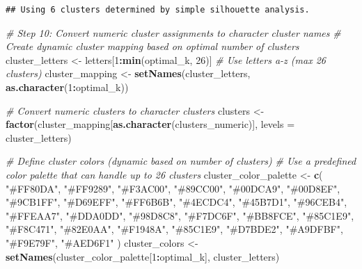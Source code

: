 \documentclass[
]{article}
\newenvironment{Shaded}{\begin{snugshade}}{\end{snugshade}}
\newcommand{\AttributeTok}[1]{\textcolor[rgb]{0.13,0.29,0.53}{#1}}
\newcommand{\CommentTok}[1]{\textcolor[rgb]{0.56,0.35,0.01}{\textit{#1}}}
\newcommand{\DecValTok}[1]{\textcolor[rgb]{0.00,0.00,0.81}{#1}}
\newcommand{\FunctionTok}[1]{\textcolor[rgb]{0.13,0.29,0.53}{\textbf{#1}}}
\newcommand{\NormalTok}[1]{#1}
\newcommand{\OtherTok}[1]{\textcolor[rgb]{0.56,0.35,0.01}{#1}}
\newcommand{\SpecialCharTok}[1]{\textcolor[rgb]{0.81,0.36,0.00}{\textbf{#1}}}
\newcommand{\StringTok}[1]{\textcolor[rgb]{0.31,0.60,0.02}{#1}}
\begin{document}
\begin{verbatim}
## Using 6 clusters determined by simple silhouette analysis.
\end{verbatim}

\begin{Shaded}
\begin{Highlighting}[]
\CommentTok{\# Step 10: Convert numeric cluster assignments to character cluster names}
\CommentTok{\# Create dynamic cluster mapping based on optimal number of clusters}
\NormalTok{cluster\_letters }\OtherTok{\textless{}{-}}\NormalTok{ letters[}\DecValTok{1}\SpecialCharTok{:}\FunctionTok{min}\NormalTok{(optimal\_k, }\DecValTok{26}\NormalTok{)]  }\CommentTok{\# Use letters a{-}z (max 26 clusters)}
\NormalTok{cluster\_mapping }\OtherTok{\textless{}{-}} \FunctionTok{setNames}\NormalTok{(cluster\_letters, }\FunctionTok{as.character}\NormalTok{(}\DecValTok{1}\SpecialCharTok{:}\NormalTok{optimal\_k))}

\CommentTok{\# Convert numeric clusters to character clusters}
\NormalTok{clusters }\OtherTok{\textless{}{-}} \FunctionTok{factor}\NormalTok{(cluster\_mapping[}\FunctionTok{as.character}\NormalTok{(clusters\_numeric)], }
                  \AttributeTok{levels =}\NormalTok{ cluster\_letters)}

\CommentTok{\# Define cluster colors (dynamic based on number of clusters)}
\CommentTok{\# Use a predefined color palette that can handle up to 26 clusters}
\NormalTok{cluster\_color\_palette }\OtherTok{\textless{}{-}} \FunctionTok{c}\NormalTok{(}
  \StringTok{"\#FF80DA"}\NormalTok{, }\StringTok{"\#FF9289"}\NormalTok{, }\StringTok{"\#F3AC00"}\NormalTok{, }\StringTok{"\#89CC00"}\NormalTok{, }\StringTok{"\#00DCA9"}\NormalTok{, }\StringTok{"\#00D8EF"}\NormalTok{, }
  \StringTok{"\#9CB1FF"}\NormalTok{, }\StringTok{"\#D69EFF"}\NormalTok{, }\StringTok{"\#FF6B6B"}\NormalTok{, }\StringTok{"\#4ECDC4"}\NormalTok{, }\StringTok{"\#45B7D1"}\NormalTok{, }\StringTok{"\#96CEB4"}\NormalTok{,}
  \StringTok{"\#FFEAA7"}\NormalTok{, }\StringTok{"\#DDA0DD"}\NormalTok{, }\StringTok{"\#98D8C8"}\NormalTok{, }\StringTok{"\#F7DC6F"}\NormalTok{, }\StringTok{"\#BB8FCE"}\NormalTok{, }\StringTok{"\#85C1E9"}\NormalTok{,}
  \StringTok{"\#F8C471"}\NormalTok{, }\StringTok{"\#82E0AA"}\NormalTok{, }\StringTok{"\#F1948A"}\NormalTok{, }\StringTok{"\#85C1E9"}\NormalTok{, }\StringTok{"\#D7BDE2"}\NormalTok{, }\StringTok{"\#A9DFBF"}\NormalTok{,}
  \StringTok{"\#F9E79F"}\NormalTok{, }\StringTok{"\#AED6F1"}
\NormalTok{)}
\NormalTok{cluster\_colors }\OtherTok{\textless{}{-}} \FunctionTok{setNames}\NormalTok{(cluster\_color\_palette[}\DecValTok{1}\SpecialCharTok{:}\NormalTok{optimal\_k], cluster\_letters)}


\end{Highlighting}
\end{Shaded}
\end{document}
